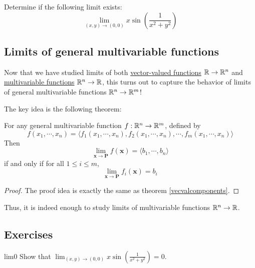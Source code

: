     \begin{example}
    Determine if the following limit exists: $$\lim_{(x,y) \to (0,0)} x\sin(\frac{1}{x^2 + y^2})$$ 
    \end{example}
    
    
    
    
    
    
    
    

\subsection{Limits of general multivariable functions}\label{limgenmulti}
    
    Now that we have studied limits of both \hyperref[limvectorval]{vector-valued functions} $\mathbb{R} \to \mathbb{R}^n$ and \hyperref[limmulti]{multivariable functions} $\mathbb{R}^n \to \mathbb{R}$, this turns out to capture the behavior of limits of general multivariable functions $\mathbb{R}^n \to \mathbb{R}^m$!
    
    The key idea is the following theorem:
    
    \begin{theorem}
    For any general multivariable function $f : \mathbb{R}^n \to \mathbb{R}^m$, defined by 
$$f(x_1, \cdots, x_n) = \big\langle f_1(x_1, \cdots, x_n), f_2(x_1, \cdots, x_n), \cdots, f_m(x_1, \cdots, x_n) \big\rangle$$
Then 
$$\lim_{\bm{x} \to \bm{P}} f(\bm{x}) = \langle b_1, \cdots, b_n \rangle$$ if and only if for all $1 \leq i \leq m$, $$ \lim_{\bm{x} \to \bm{P}} f_i(\bm{x}) = b_i$$

    \end{theorem}
    
    \begin{proof}
    The proof idea is exactly the same as theorem \ref{vecvalcomponents}.
    \end{proof}
    
    Thus, it is indeed enough to study limits of multivariable functions $\mathbb{R}^n \to \mathbb{R}$.
    
    
    
    
    

\subsection{Exercises}



\begin{problem}{lim0}
Show that $\lim_{(x,y) \to (0,0)} x\sin(\frac{1}{x^2 + y^2}) =0$.
\end{problem}

